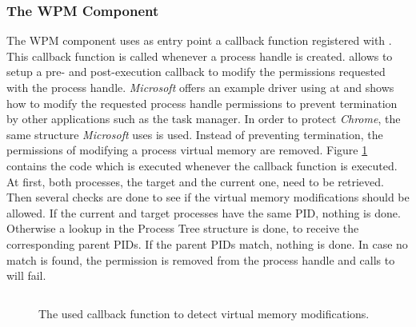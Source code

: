 \subsubsection{The WPM Component}
The \gls{WPM} component uses as entry point a callback function registered with . This callback function is called whenever a process handle is created.  allows to setup a pre- and post-execution callback to modify the permissions requested with the process handle. \emph{Microsoft} offers an example driver using  at \cite{github_obcallback} and shows how to modify the requested process handle permissions to prevent termination by other applications such as the task manager. In order to protect \emph{Chrome}, the same structure \emph{Microsoft} uses is used. Instead of preventing termination, the permissions of modifying a process virtual memory are removed. Figure \ref{code:code7} contains the code which is executed whenever the callback function is executed. At first, both processes, the target and the current one, need to be retrieved. Then several checks are done to see if the virtual memory modifications should be allowed. If the current and target processes have the same \gls{PID}, nothing is done. Otherwise a lookup in the Process Tree structure is done, to receive the corresponding parent \glspl{PID}. If the parent \glspl{PID} match, nothing is done. In case no match is found, the permission  is removed from the process handle and calls to  will fail.
\begin{figure}[h]
\inputminted[breakanywhere, breaklines,fontsize=\scriptsize, frame=single, mathescape, linenos, numbersep=5pt, numbersep=5pt, xleftmargin=0pt]{c}{sections/implementation/code7.c}
\caption{The used callback function to detect virtual memory modifications.}
\label{code:code7}
\end{figure}
